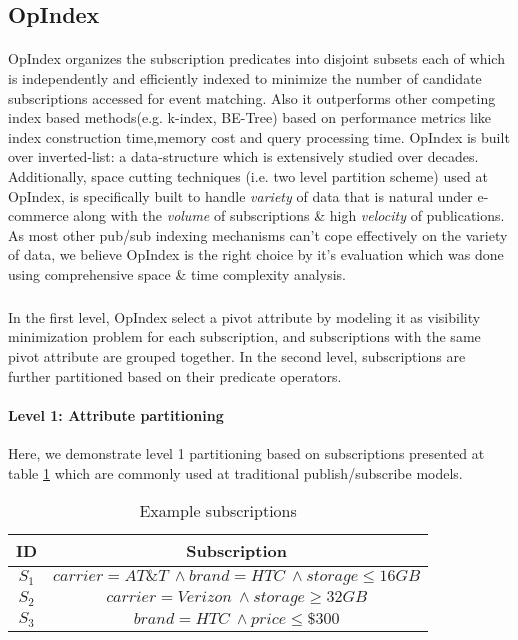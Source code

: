 \documentclass[a4paper,12pt,oneside]{book}
\theoremstyle{definition}
\theoremstyle{remark}
\begin{document}
\subsection{OpIndex}
\paragraph*{}
OpIndex organizes the subscription predicates into disjoint subsets each of which is independently and efficiently indexed to minimize the number of candidate subscriptions accessed for event matching. Also it outperforms other competing index based methods(e.g. k-index, BE-Tree) based on performance metrics like index construction time,memory cost and query processing time. OpIndex is built over inverted-list: a data-structure which is extensively studied over decades. Additionally, space cutting techniques (i.e. two level partition scheme) used at OpIndex, is specifically built to handle \emph{variety} of data that is natural under e-commerce along with the \emph{volume} of subscriptions \& high \emph{velocity} of publications. As most other pub/sub indexing mechanisms can't cope effectively on the variety of data, we believe OpIndex is the right choice by it's evaluation which was done using comprehensive space \& time complexity analysis.
\subparagraph*{}
In the first level, OpIndex select a pivot attribute by modeling it as visibility minimization problem \cite{Zhang2014} for each subscription, and subscriptions with the same pivot attribute are grouped together. In the second level, subscriptions are further partitioned based on their predicate operators. 

\paragraph*{Level 1: Attribute partitioning}
Here, we demonstrate level 1 partitioning based on subscriptions presented at table \ref{ta:exsub} which are commonly used at traditional publish/subscribe models.

\begin{table}[ht]
\caption{Example subscriptions} %
\centering %
\begin{tabular}{c c} %
\hline\hline %
ID & Subscription \\ [0.5ex] %
\hline %
$S_1$ & $carrier=AT\&T\ \wedge brand=HTC\ \wedge storage\leq16GB$ \\ %
$S_2$ & $carrier=Verizon\ \wedge storage\geq32GB$ \\
$S_3$ & $brand=HTC\ \wedge price\leq\$300$ \\ [1ex] %
\hline %
\end{tabular}
\label{ta:exsub}
\end{table}
\end{document}
